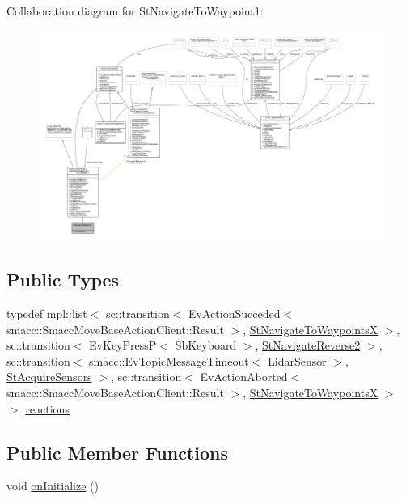 Collaboration diagram for St\+Navigate\+To\+Waypoint1\+:
\nopagebreak
\begin{figure}[H]
\begin{center}
\leavevmode
\includegraphics[width=350pt]{structStNavigateToWaypoint1__coll__graph}
\end{center}
\end{figure}
\subsection*{Public Types}
\begin{DoxyCompactItemize}
\item 
typedef mpl\+::list$<$ sc\+::transition$<$ Ev\+Action\+Succeded$<$ smacc\+::\+Smacc\+Move\+Base\+Action\+Client\+::\+Result $>$, \hyperlink{structStNavigateToWaypointsX}{St\+Navigate\+To\+WaypointsX} $>$, sc\+::transition$<$ Ev\+Key\+PressP$<$ Sb\+Keyboard $>$, \hyperlink{structStNavigateReverse2}{St\+Navigate\+Reverse2} $>$, sc\+::transition$<$ \hyperlink{structsmacc_1_1EvTopicMessageTimeout}{smacc\+::\+Ev\+Topic\+Message\+Timeout}$<$ \hyperlink{sensor__state_8h_a9db9e1944f88de79507758d08e4a2ee3}{Lidar\+Sensor} $>$, \hyperlink{structStAcquireSensors}{St\+Acquire\+Sensors} $>$, sc\+::transition$<$ Ev\+Action\+Aborted$<$ smacc\+::\+Smacc\+Move\+Base\+Action\+Client\+::\+Result $>$, \hyperlink{structStNavigateToWaypointsX}{St\+Navigate\+To\+WaypointsX} $>$ $>$ \hyperlink{structStNavigateToWaypoint1_aa6eccd5225b9a5a208126ec518defdd5}{reactions}
\end{DoxyCompactItemize}
\subsection*{Public Member Functions}
\begin{DoxyCompactItemize}
\item 
void \hyperlink{structStNavigateToWaypoint1_abf862e4062f5c46d80c0779db4485387}{on\+Initialize} ()
\end{DoxyCompactItemize}
